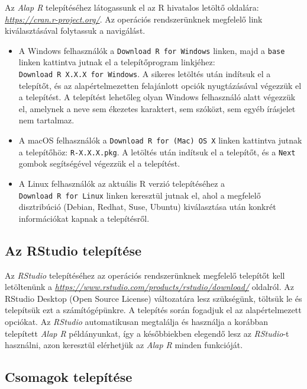 \documentclass[
]{book}
\providecommand{\tightlist}{%
  \setlength{\itemsep}{0pt}\setlength{\parskip}{0pt}}
\begin{document}
Az \emph{Alap R} telepítéséhez látogassunk el az R hivatalos letöltő oldalára: \emph{\url{https://cran.r-project.org/}}. Az operációs rendszerünknek megfelelő link kiválasztásával folytassuk a navigálást.

\begin{itemize}
\tightlist
\item
  A Windows felhasználók a \texttt{Download\ R\ for\ Windows} linken, majd a \texttt{base} linken kattintva jutnak el a telepítőprogram linkjéhez: \texttt{Download\ R\ X.X.X\ for\ Windows}. A sikeres letöltés után indítsuk el a telepítőt, és az alapértelmezetten felajánlott opciók nyugtázásával végezzük el a telepítést. A telepítést lehetőleg olyan Windows felhasználó alatt végezzük el, amelynek a neve sem ékezetes karaktert, sem szóközt, sem egyéb írásjelet nem tartalmaz.
\item
  A macOS felhasználók a \texttt{Download\ R\ for\ (Mac)\ OS\ X} linken kattintva jutnak a telepítőhöz: \texttt{R-X.X.X.pkg}. A letöltés után indítsuk el a telepítőt, és a \texttt{Next} gombok segítségével végezzük el a telepítést.
\item
  A Linux felhasználók az aktuális R verzió telepítéséhez a \texttt{Download\ R\ for\ Linux} linken keresztül jutnak el, ahol a megfelelő disztribúció (Debian, Redhat, Suse, Ubuntu) kiválasztása után konkrét információkat kapnak a telepítésről.
\end{itemize}

\hypertarget{az-rstudio-telepuxedtuxe9se}{%
\subsection{Az RStudio telepítése}\label{az-rstudio-telepuxedtuxe9se}}

Az \emph{RStudio} telepítéséhez az operációs rendszerünknek megfelelő telepítőt kell letöltenünk a \emph{\url{https://www.rstudio.com/products/rstudio/download/}} oldalról. Az RStudio Desktop (Open Source License) változatára lesz szükségünk, töltsük le és telepítsük ezt a számítógépünkre. A telepítés során fogadjuk el az alapértelmezett opciókat. Az \emph{RStudio} automatikusan megtalálja és használja a korábban telepített \emph{Alap R} példányunkat, így a későbbiekben elegendő lesz az \emph{RStudio}-t használni, azon keresztül elérhetjük az \emph{Alap R} minden funkcióját.

\hypertarget{Csomagoktelepitese}{%
\subsection{Csomagok telepítése}\label{Csomagoktelepitese}}
\end{document}
